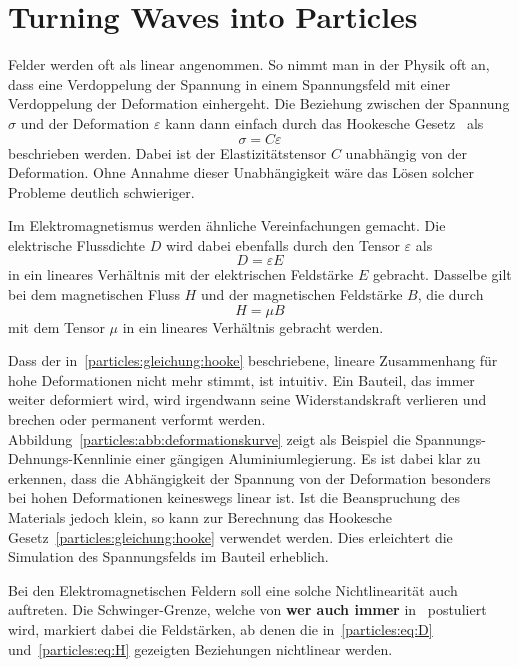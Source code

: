 %
%
%
%
\chapter{Turning Waves into Particles\label{chapter:particles}}
\begin{refsection}

Felder werden oft als linear angenommen. 
So nimmt man in der Physik oft an, dass eine Verdoppelung der Spannung in einem Spannungsfeld mit einer Verdoppelung der Deformation einhergeht.
Die Beziehung zwischen der Spannung $\sigma$ und der Deformation $\varepsilon$ kann dann einfach durch das Hookesche Gesetz~\cite{todo} als
\[
    \sigma = C \varepsilon \label{particles:gleichung:hooke}
\]
beschrieben werden. %
Dabei ist der Elastizitätstensor $C$ unabhängig von der Deformation.
Ohne Annahme dieser Unabhängigkeit wäre das Lösen solcher Probleme deutlich schwieriger.

Im Elektromagnetismus werden ähnliche Vereinfachungen gemacht. 
Die elektrische Flussdichte $D$ wird dabei ebenfalls durch den Tensor $\varepsilon$ als
\[
    D = \varepsilon E \label{particles:eq:D}
\]
in ein lineares Verhältnis mit der elektrischen Feldstärke $E$ gebracht.
Dasselbe gilt bei dem magnetischen Fluss $H$ und der magnetischen Feldstärke $B$, die durch
\[
    H = \mu B \label{particles:eq:H}
\]
mit dem Tensor $\mu$ in ein lineares Verhältnis gebracht werden.

Dass der in~\ref{particles:gleichung:hooke} beschriebene, lineare Zusammenhang für hohe Deformationen nicht mehr stimmt, ist intuitiv.
Ein Bauteil, das immer weiter deformiert wird, wird irgendwann seine Widerstandskraft verlieren und brechen oder permanent verformt werden.
Abbildung~\ref{particles:abb:deformationskurve} zeigt als Beispiel die Spannungs-Dehnungs-Kennlinie einer gängigen Aluminiumlegierung. %
Es ist dabei klar zu erkennen, dass die Abhängigkeit der Spannung von der Deformation besonders bei hohen Deformationen keineswegs linear ist.
Ist die Beanspruchung des Materials jedoch klein, so kann zur Berechnung das Hookesche Gesetz~\ref{particles:gleichung:hooke} verwendet werden.
Dies erleichtert die Simulation des Spannungsfelds im Bauteil erheblich.

Bei den Elektromagnetischen Feldern soll eine solche Nichtlinearität auch auftreten.
Die Schwinger-Grenze, welche von \textbf{wer auch immer} in~\cite{todo} postuliert wird, markiert dabei die Feldstärken, ab denen die in~\ref{particles:eq:D} und~\ref{particles:eq:H} gezeigten Beziehungen nichtlinear werden. %


\end{refsection}
